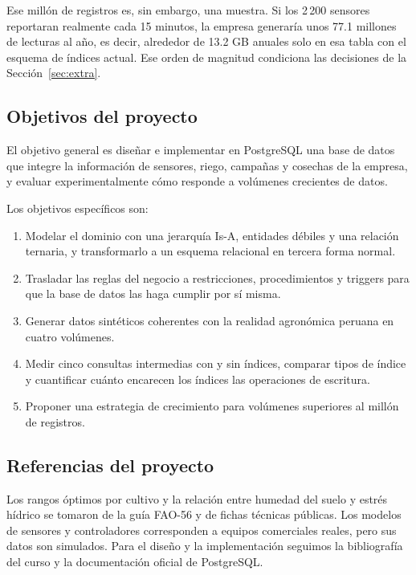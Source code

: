 \documentclass[11pt,letterpaper]{article}
\begin{document}
Ese millón de registros es, sin embargo, una muestra. Si los 2\,200 sensores reportaran realmente cada 15 minutos, la empresa generaría unos 77.1 millones de lecturas al año, es decir, alrededor de 13.2 GB anuales solo en esa tabla con el esquema de índices actual. Ese orden de magnitud condiciona las decisiones de la Sección~\ref{sec:extra}.

\subsection{Objetivos del proyecto}

El objetivo general es diseñar e implementar en PostgreSQL una base de datos que integre la información de sensores, riego, campañas y cosechas de la empresa, y evaluar experimentalmente cómo responde a volúmenes crecientes de datos.

Los objetivos específicos son:
\begin{enumerate}[leftmargin=1.6em,itemsep=0.1em]
\item Modelar el dominio con una jerarquía Is-A, entidades débiles y una relación ternaria, y transformarlo a un esquema relacional en tercera forma normal.
\item Trasladar las reglas del negocio a restricciones, procedimientos y triggers para que la base de datos las haga cumplir por sí misma.
\item Generar datos sintéticos coherentes con la realidad agronómica peruana en cuatro volúmenes.
\item Medir cinco consultas intermedias con y sin índices, comparar tipos de índice y cuantificar cuánto encarecen los índices las operaciones de escritura.
\item Proponer una estrategia de crecimiento para volúmenes superiores al millón de registros.
\end{enumerate}

\subsection{Referencias del proyecto}

Los rangos óptimos por cultivo y la relación entre humedad del suelo y estrés hídrico se tomaron de la guía FAO-56 y de fichas técnicas públicas. Los modelos de sensores y controladores corresponden a equipos comerciales reales, pero sus datos son simulados. Para el diseño y la implementación seguimos la bibliografía del curso y la documentación oficial de PostgreSQL.
\end{document}
